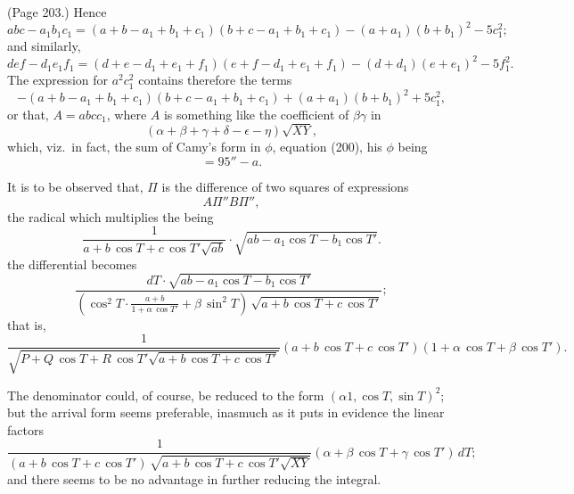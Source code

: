 \documentclass[11pt,a4paper]{article}
\theoremstyle{plain}
\theoremstyle{definition}
\begin{document}
\medskip

\noindent (Page 203.) Hence
\[
abc - a_1 b_1 c_1 = (a + b - a_1 + b_1 + c_1) (b + c - a_1 + b_1 + c_1) - (a + a_1) (b + b_1)^2 - 5 c_1^2;
\]
and similarly,
\[
def - d_1 e_1 f_1 = (d + e - d_1 + e_1 + f_1)(e + f - d_1 + e_1 + f_1) - (d + d_1)(e + e_1)^2 - 5 f_1^2.
\]
The expression for $a^2 c_1^2$ contains therefore the terms
\[
- (a + b - a_1 + b_1 + c_1)(b + c - a_1 + b_1 + c_1) + (a + a_1) ( b + b_1)^2 + 5 c_1^2,
\]
or that, $A = a b c c_1$, where $A$ is something like the coefficient of $\beta \gamma$ in
\[
(\alpha + \beta + \gamma + \delta - \epsilon - \eta) \sqrt{X Y},
\]
which, viz.\ in fact, the sum of Camy's form in $\phi$, equation (200), his $\phi$ being
\[
= 95'' - a.
\]

It is to be observed that, $\Pi$ is the difference of two squares of expressions
\[
A \Pi'' B \Pi'',
\]
the radical which multiplies the being
\[
\frac{1}{a + b\, \cos T + c\, \cos T'\sqrt{a b}} \cdot \sqrt{a b - a_1 \cos T - b_1 \cos T'}.
\]
the differential becomes
\[
\frac{d T \cdot \sqrt{a b - a_1 \cos T - b_1 \cos T'}}{(\cos^2 T \cdot \frac{a + b}{1 + \alpha\, \cos T'} + \beta\, \sin^2 T)\,\sqrt{a + b\,\cos T + c\,\cos T'}};
\]
that is,
\[
\frac{1}{\sqrt{P + Q\,\cos T + R\,\cos T'\sqrt{a + b\,\cos T + c\,\cos T'}}} (a + b\,\cos T + c\,\cos T') (1 + \alpha\,\cos T + \beta\,\cos T').
\]

The denominator could, of course, be reduced to the form $(\alpha 1, \cos T, \sin T)^2$; but the arrival form seems preferable, inasmuch as it puts in evidence the linear factors
\[
\frac{1}{(a + b\,\cos T + c\,\cos T')\,\sqrt{a + b\,\cos T + c\,\cos T'\sqrt{X Y}}} (\alpha + \beta\,\cos T + \gamma\,\cos T') \,dT;
\]
and there seems to be no advantage in further reducing the integral.

\medskip
\end{document}
